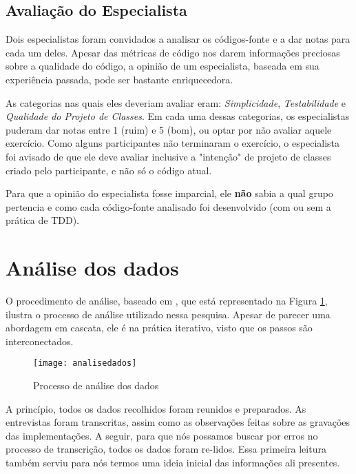 \subsection{Avaliação do Especialista}
\label{sec:planejamento-especialista}

Dois especialistas foram convidados a analisar os códigos-fonte e a dar notas para cada
um deles. Apesar das métricas de código nos darem informações
preciosas sobre a qualidade do código, a opinião de um especialista, baseada
em sua experiência passada, pode ser bastante enriquecedora.

As categorias nas quais eles deveriam avaliar eram: \textit{Simplicidade}, \textit{Testabilidade} e
\textit{Qualidade do Projeto de Classes}.
Em cada uma dessas categorias, os especialistas puderam dar notas entre
1 (ruim) e 5 (bom), ou optar por não avaliar aquele exercício.
Como alguns participantes não terminaram o exercício, o especialista
foi avisado de que ele deve avaliar inclusive a "intenção" de projeto de classes criado
pelo participante, e não só o código atual. 

Para que a opinião do especialista fosse imparcial, ele \textbf{não} sabia a qual grupo
pertencia e como cada código-fonte analisado foi desenvolvido (com ou sem a prática de TDD).

\section{Análise dos dados}
\label{sec:planejamento-analise}

O procedimento de análise, baseado em \cite{creswell}, que está representado na
Figura \ref{fig:analise-dados}, ilustra o processo de análise utilizado
nessa pesquisa. Apesar de parecer uma abordagem em cascata, ele é na prática 
iterativo, visto que os passos são interconectados. 

\begin{figure}[h]
  \centering
  \texttt{[image: analisedados]}
  \caption{Processo de análise dos dados}
  \label{fig:analise-dados}
\end{figure}


A princípio, todos os dados recolhidos foram reunidos e preparados. As entrevistas
foram transcritas, assim como as observações feitas sobre as gravações das implementações.
A seguir, para que nós possamos buscar por erros no processo de transcrição, todos
os dados foram re-lidos. Essa primeira leitura também serviu para nós termos
uma ideia inicial das informações ali presentes.


